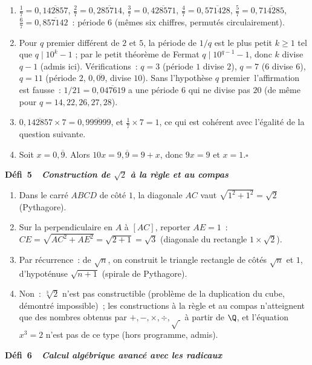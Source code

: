 \begin{enumerate}
  \item $\frac17=0{,}\overline{142857}$, $\frac27=0{,}\overline{285714}$, $\frac37=0{,}\overline{428571}$, $\frac47=0{,}\overline{571428}$, $\frac57=0{,}\overline{714285}$, $\frac67=0{,}\overline{857142}$~:
        p\'eriode $6$ (m\^emes six chiffres, permut\'es circulairement).
  \item Pour $q$ premier diff\'erent de $2$ et $5$, la p\'eriode de $1/q$ est le plus petit $k\ge1$ tel que $q\mid10^k-1$ ; par le petit th\'eor\`eme de Fermat $q\mid10^{q-1}-1$, donc $k$ divise $q-1$ (admis ici).
        V\'erifications~: $q=3$ (p\'eriode $1$ divise $2$), $q=7$ ($6$ divise $6$), $q=11$ (p\'eriode $2$, $0{,}\overline{09}$, divise $10$).
        Sans l'hypoth\`ese \og $q$ premier\fg\ l'affirmation est fausse~: $1/21=0{,}\overline{047619}$ a une p\'eriode $6$ qui ne divise pas $20$ (de m\^eme pour $q=14, 22, 26, 27, 28$).
  \item $0{,}\overline{142857}\times7=0{,}\overline{999999}$, et $\frac17\times7=1$, ce qui est coh\'erent avec l'\'egalit\'e de la question suivante.
  \item Soit $x=0{,}\overline9$. Alors $10x=9{,}\overline9=9+x$, donc $9x=9$ et $x=1$.\hfill$\square$
\end{enumerate}
\noindent{}
{\color{BO}\bfseries\small D\'efi~5~\textendash\ \textit{Construction de $\sqrt{2}$ \`a la r\`egle et au compas}}
\par\smallskip

\begin{enumerate}
  \item Dans le carr\'e $ABCD$ de c\^ot\'e $1$, la diagonale $AC$ vaut $\sqrt{1^2+1^2}=\sqrt2$ (Pythagore).
  \item Sur la perpendiculaire en $A$ \`a $[AC]$, reporter $AE=1$~: $CE=\sqrt{AC^2+AE^2}=\sqrt{2+1}=\sqrt3$ (diagonale du rectangle $1\times\sqrt2$).
  \item Par r\'ecurrence~: de $\sqrt n$, on construit le triangle rectangle de c\^ot\'es $\sqrt n$ et $1$, d'hypot\'enuse $\sqrt{n+1}$ (spirale de Pythagore).
  \item Non~: $\sqrt[3]2$ n'est pas constructible (probl\`eme de la duplication du cube, d\'emontr\'e impossible)~; les constructions \`a la r\`egle et au compas n'atteignent que des nombres obtenus par $+,-,\times,\div,\sqrt{\ }$ \`a partir de $\Q$, et l'\'equation $x^3=2$ n'est pas de ce type (hors programme, admis).
\end{enumerate}
\noindent{}
{\color{BO}\bfseries\small D\'efi~6~\textendash\ \textit{Calcul alg\'ebrique avanc\'e avec les radicaux}}
\par\smallskip

